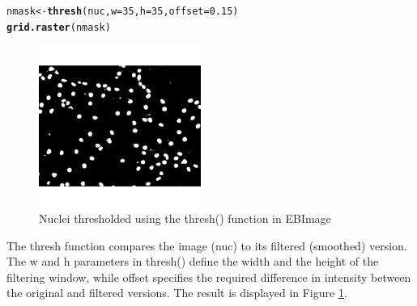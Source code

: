 \documentclass{article}\usepackage[]{graphicx}\usepackage[]{color}
\makeatletter
\newcommand{\hlnum}[1]{\textcolor[rgb]{0.686,0.059,0.569}{#1}}%
\newcommand{\hlstd}[1]{\textcolor[rgb]{0.345,0.345,0.345}{#1}}%
\newcommand{\hlkwb}[1]{\textcolor[rgb]{0.69,0.353,0.396}{#1}}%
\newcommand{\hlkwc}[1]{\textcolor[rgb]{0.333,0.667,0.333}{#1}}%
\newcommand{\hlkwd}[1]{\textcolor[rgb]{0.737,0.353,0.396}{\textbf{#1}}}%
\newenvironment{kframe}{%
 \def\at@end@of@kframe{}%
 \ifinner\ifhmode%
  \def\at@end@of@kframe{\end{minipage}}%
  \begin{minipage}{\columnwidth}%
 \fi\fi%
 \def\FrameCommand##1{\hskip\@totalleftmargin \hskip-\fboxsep
 \colorbox{shadecolor}{##1}\hskip-\fboxsep
     \hskip-\linewidth \hskip-\@totalleftmargin \hskip\columnwidth}%
 \MakeFramed {\advance\hsize-\width
   \@totalleftmargin\z@ \linewidth\hsize
   \@setminipage}}%
 {\par\unskip\endMakeFramed%
 \at@end@of@kframe}
\newenvironment{knitrout}{}{} %
\makeatother
\begin{document}
\begin{knitrout}
\color{fgcolor}\begin{kframe}
\begin{alltt}
\hlstd{nmask} \hlkwb{<-} \hlkwd{thresh}\hlstd{(nuc,} \hlkwc{w} \hlstd{=} \hlnum{35}\hlstd{,} \hlkwc{h} \hlstd{=} \hlnum{35}\hlstd{,} \hlkwc{offset} \hlstd{=} \hlnum{0.15}\hlstd{)}
\hlkwd{grid.raster}\hlstd{(nmask)}
\end{alltt}
\end{kframe}\begin{figure}[]


{\centering \includegraphics[width=200px]{knit_figure/figthr} 

}

\caption[Nuclei thresholded using the thresh() function in EBImage]{Nuclei thresholded using the thresh() function in EBImage\label{fig:thr}}
\end{figure}


\end{knitrout}

The thresh function compares the image (nuc) to its filtered (smoothed) version. The w and h parameters in thresh() define the width and the height of the filtering window, while offset specifies the required difference in intensity between the original and filtered versions. The result is displayed in Figure \ref{fig:thr}.
\end{document}
